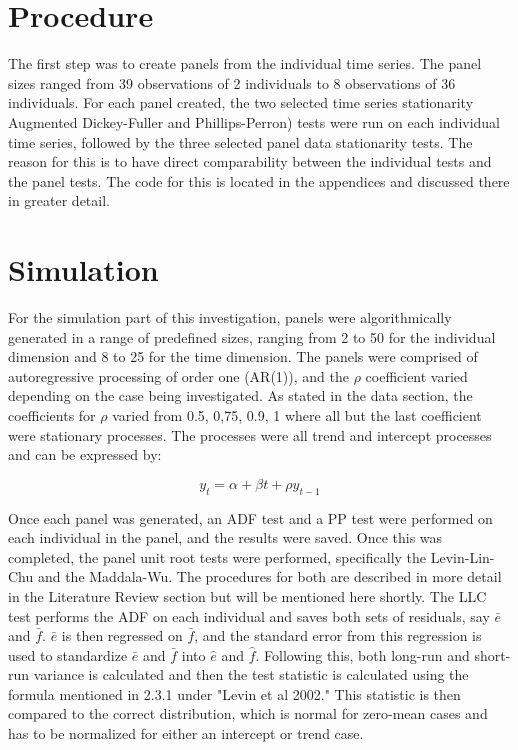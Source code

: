 \section{Procedure}

The first step was to create panels from the individual time series. The panel sizes ranged from 39 observations of 2 individuals to 8 observations of 36 individuals. For each panel created, the two selected time series stationarity Augmented Dickey-Fuller and Phillips-Perron) tests were run on each individual time series, followed by the three selected panel data stationarity tests. The reason for this is to have direct comparability between the individual tests and the panel tests. The code for this is located in the appendices and discussed there in greater detail.

\section{Simulation}

For the simulation part of this investigation, panels were algorithmically generated in a range of predefined sizes, ranging from 2 to 50 for the individual dimension and 8 to 25 for the time dimension. The panels were comprised of autoregressive processing of order one (AR(1)), and the $\rho$ coefficient varied depending on the case being investigated. As stated in the data section, the coefficients for $\rho$ varied from 0.5, 0,75, 0.9, 1 where all but the last coefficient were stationary processes. The processes were all trend and intercept processes and can be expressed by:

\begin{equation}
y_t = \alpha + \beta t + \rho y_{t-1}
\end{equation}

Once each panel was generated, an ADF test and a PP test were performed on each individual in the panel, and the results were saved. Once this was completed, the panel unit root tests were performed, specifically the Levin-Lin-Chu and the Maddala-Wu. The procedures for both are described in more detail in the Literature Review section but will be mentioned here shortly. The LLC test performs the ADF on each individual and saves both sets of residuals, say $\bar{e}$ and $\bar{f}$. $\bar{e}$ is then regressed on $\bar{f}$, and the standard error from this regression is used to standardize $\bar{e}$ and $\bar{f}$ into $\hat{e}$ and $\hat{f}$. Following this, both long-run and short-run variance is calculated and then the test statistic is calculated using the formula mentioned in 2.3.1 under "Levin et al 2002." This statistic is then compared to the correct distribution, which is normal for zero-mean cases and has to be normalized for either an intercept or trend case.


